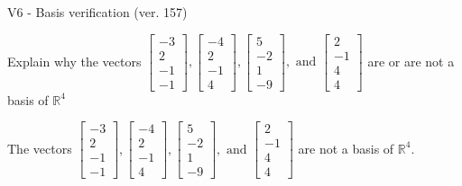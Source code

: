\begin{exercise}
  \begin{exerciseTitle}V6 - Basis verification (ver. 157)\end{exerciseTitle}
  \begin{exerciseStatement}
    Explain why the vectors \(\left[\begin{array}{r}
-3 \\
2 \\
-1 \\
-1
\end{array}\right] , \left[\begin{array}{r}
-4 \\
2 \\
-1 \\
4
\end{array}\right] , \left[\begin{array}{r}
5 \\
-2 \\
1 \\
-9
\end{array}\right] , \text{ and } \left[\begin{array}{r}
2 \\
-1 \\
4 \\
4
\end{array}\right]\) are or are not a basis of \(\mathbb{R}^4\)	


  \end{exerciseStatement}
  \begin{exerciseAnswer}
   The vectors \(\left[\begin{array}{r}
-3 \\
2 \\
-1 \\
-1
\end{array}\right] , \left[\begin{array}{r}
-4 \\
2 \\
-1 \\
4
\end{array}\right] , \left[\begin{array}{r}
5 \\
-2 \\
1 \\
-9
\end{array}\right] , \text{ and } \left[\begin{array}{r}
2 \\
-1 \\
4 \\
4
\end{array}\right]\) 
  	 are not  a basis of \(\mathbb{R}^4\).
  


  \end{exerciseAnswer}
\end{exercise}